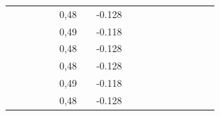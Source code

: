 \documentclass[a4paper,12pt]{article}
\begin{document}
\begin{landscape}
\begin{table}[]
\begin{tabular}{|c|c|c|c|c|c|c|c|c|c|c|c|c|c|c|c|c|}
                     &                           &                         &                         &                        & 0,48 &                         & -0.128  &                          &                          &                          &                           &                        &                           &                           &                         &                           \\ \cline{6-6} \cline{8-8}
                     &                           &                         &                         &                        & 0,49 &                         & -0.118  &                          &                          &                          &                           &                        &                           &                           &                         &                           \\ \cline{6-6} \cline{8-8}
                     &                           &                         &                         &                        & 0,48 &                         & -0.128  &                          &                          &                          &                           &                        &                           &                           &                         &                           \\ \cline{6-6} \cline{8-8}
                     &                           &                         &                         &                        & 0,48 &                         & -0.128  &                          &                          &                          &                           &                        &                           &                           &                         &                           \\ \cline{6-6} \cline{8-8}
                     &                           &                         &                         &                        & 0,49 &                         & -0.118  &                          &                          &                          &                           &                        &                           &                           &                         &                           \\ \cline{6-6} \cline{8-8}
                     &                           &                         &                         &                        & 0,48 &                         & -0.128  &                          &                          &                          &                           &                        &                           &                           &                         &                           \\ \cline{4-6} \cline{8-8} \cline{10-12} \cline{14-15} \cline{17-17} 

\end{tabular}
\end{table}
\end{landscape}
\end{document}
